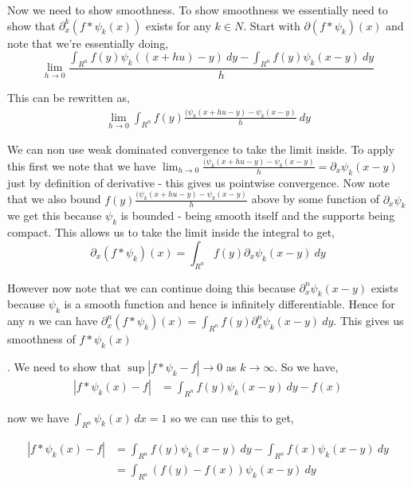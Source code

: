 \documentclass[a4paper]{article}
\begin{document}
\vspace{1em}

Now we need to show smoothness. To show smoothness we essentially need to show that $\partial_x^{k} (f * \psi_k(x))$ exists for any $k \in N$. Start with $\partial (f * \psi_k)(x)$ and note that we're essentially doing, 
\[
  \lim_{h \to 0} \frac{\int_{R^{n}}^{}  f(y) \psi_k((x + hu)- y) \ dy - \int_{R^{n}}^{}  f(y) \psi_k(x- y) \ dy}{h}
\]

This can be rewritten as, 
\begin{align*}
  \lim_{h \to 0} \int_{R^{n}}^{} f(y) \frac{ ( \psi_k(x + hu- y) - \psi_k(x - y)}{h} \ dy
\end{align*}

We can non use weak dominated convergence to take the limit inside. To apply this first we note that we have $\lim_{h \to 0}  \frac{ ( \psi_k(x + hu- y) - \psi_k(x - y)}{h}  =\partial_x \psi_k(x - y)$ just by definition of derivative - this gives us pointwise convergence. Now note that we also bound  $ f(y) \frac{ ( \psi_k(x + hu- y) - \psi_k(x - y)}{h}$  above by some function of $\partial_x \psi_k$ we get this because $\psi_k$ is bounded - being smooth itself and the supports being compact. This allows us to take the limit inside the integral to get, 
\[
  \partial_x (f * \psi_k)(x) = \int_{R^{n}}^{} f(y) \partial_x \psi_k(x - y) \ dy
\]

However now note that we can continue doing this because $\partial_x^{n} \psi_k(x - y)$ exists because $\psi_k$ is a smooth function and hence is infinitely differentiable. Hence for any $n$ we can have $\partial_x^{n}(f * \psi_k)(x) = \int_{R^{n}}^{}  f(y) \partial_x^{n} \psi_k(x - y) \ dy$. This gives us smoothness of $f * \psi_k(x)$


\vspace{1em}

. We need to show that $\sup |f * \psi_k - f| \longrightarrow 0$ as $k \to \infty$. So we have, 
\begin{align*}
  |f * \psi_k(x) - f| &= \int_{R^{n}}^{}  f(y) \psi_k(x - y)  \ dy - f(x)  
\end{align*}

now we have $\int_{R^{n}}^{} \psi_k(x) \ dx = 1$ so we can use this to get, 

\begin{align*}
  |f * \psi_k(x) - f| &= \int_{R^{n}}^{}  f(y) \psi_k(x - y)  \ dy - \int_{R^{n}}^{}  f(x) \psi_k(x - y) \ dy\\
                      &=  \int_{R^{n}}^{}  (f(y) - f(x)) \psi_k(x - y)  \ dy
\end{align*}
\end{document}
